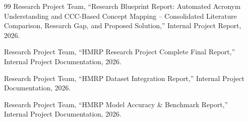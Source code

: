 \documentclass[10pt,conference]{IEEEtran}
\begin{document}
\begin{thebibliography}{99}
 Research Project Team, ``Research Blueprint Report: Automated Acronym Understanding and CCC-Based Concept Mapping -- Consolidated Literature Comparison, Research Gap, and Proposed Solution,'' Internal Project Report, 2026.

 Research Project Team, ``HMRP Research Project Complete Final Report,'' Internal Project Documentation, 2026.

 Research Project Team, ``HMRP Dataset Integration Report,'' Internal Project Documentation, 2026.

 Research Project Team, ``HMRP Model Accuracy \& Benchmark Report,'' Internal Project Documentation, 2026.

\end{thebibliography}
\end{document}
